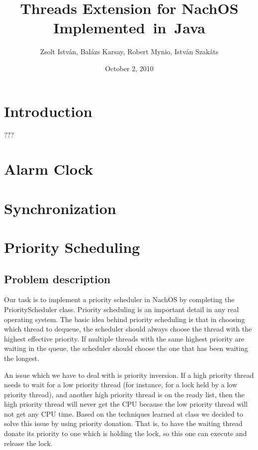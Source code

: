 \documentclass[a4paper,10pt]{article}
\title{Threads Extension for NachOS Implemented~in~Java}
\author{Zsolt Istv\'{a}n, Bal\'{a}zs Karsay, Robert Mynio, Istv\'{a}n Szak\'{a}ts}
\date{October 2, 2010}
\begin{document}
\maketitle

\section{Introduction}

???

\section{Alarm Clock}


\section{Synchronization}


\section{Priority Scheduling}

\subsection{Problem description}

Our task is to implement a priority scheduler in NachOS by completing the PriorityScheduler class. Priority scheduling is an important detail in any real operating system. The basic idea behind priority scheduling is that in choosing which thread to dequeue, the scheduler should always choose the thread with the highest effective priority. If multiple threads with the same highest priority are waiting in the queue, the scheduler should choose the one that has been waiting the longest.

An issue which we have to deal with is priority inversion. If a high priority thread needs to wait for a low priority thread (for instance, for a lock held by a low priority thread), and another high priority thread is on the ready list, then the high priority thread will never get the CPU because the low priority thread will not get any CPU time. Based on the techniques learned at class we decided to solve this issue by using priority donation. That is, to have the waiting thread donate its priority to one which is holding the lock, so this one can execute and release the lock.
\end{document}
